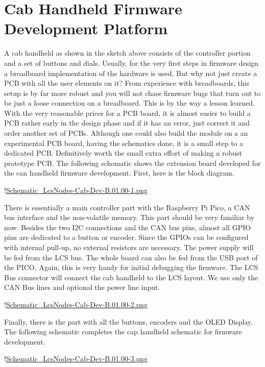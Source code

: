 \chapter{Cab Handheld Firmware Development Platform}

A cab handheld as shown in the sketch above consists of the controller portion and a set of buttons and dials. Usually, for the very first steps in firmware design a breadboard implementation of the hardware is used. But why not just create a PCB with all the user elements on it? From experience with breadboards, this setup is by far more robust and you will not chase firmware bugs that turn out to be just a loose connection on a breadboard. This is by the way a lesson learned. With the very reasonable prices for a PCB board, it is almost easier to build a PCB rather early in the design phase and if it has an error, just correct it and order another set of PCBs. Although one could also build the module on a an experimental PCB board, having the schematics done, it is a small step to a dedicated PCB. Definitively worth the small extra effort of making a robust prototype PCB. The following schematic shows the extension board developed for the can handheld firmware development. First, here is the block diagram.

!\href{./Schematics/Schematic_LcsNodes-Cab-Dev-B.01.00-1.png }{Schematic_LcsNodes-Cab-Dev-B.01.00-1.png}

There is essentially a main controller part with the Raspberry Pi Pico, a CAN bus interface and the non-volatile memory. This part should be very familiar by now. Besides the two I2C connections and the CAN bus pins, almost all GPIO pins are dedicated to a button or encoder. Since the GPIOs can be configured with internal pull-up, no external resistors are necessary. The power supply will be fed from the LCS bus. The whole board can also be fed from the USB port of the PICO. Again, this is very handy for initial debugging the firmware. The LCS Bus connector will connect the cab handheld to the LCS layout. We use only the CAN Bus lines and optional the power line input.

!\href{./Schematics/Schematic_LcsNodes-Cab-Dev-B.01.00-2.png }{Schematic_LcsNodes-Cab-Dev-B.01.00-2.png}

Finally, there is the part with all the buttons, encoders and the OLED Display. The following schematic completes the cap handheld schematic for firmware development.

!\href{./Schematics/Schematic_LcsNodes-Cab-Dev-B.01.00-3.png }{Schematic_LcsNodes-Cab-Dev-B.01.00-3.png}

